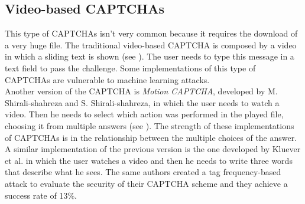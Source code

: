 \subsection{Video-based CAPTCHAs}
This type of CAPTCHAs isn't very common because it requires the download of a very huge file\cite{survey_advanced_CAPTCHA}. The traditional video-based CAPTCHA is composed by a video in which a sliding text is shown (see ). The user needs to type this message in a text field to pass the challenge. Some implementations of this type of CAPTCHAs are vulnerable to machine learning attacks.\\
Another version of the CAPTCHA is \textit{Motion CAPTCHA}\cite{Motion_CAPTCHA}, developed by M. Shirali-shahreza and S. Shirali-shahreza, in which the user needs to watch a video. Then he needs to select which action was performed in the played file, choosing it from multiple answers (see ). The strength of these implementations of CAPTCHAs is in the relationship between the multiple choices of the answer\cite{video_attack}.\\
A similar implementation of the previous version is the one developed by Kluever et al. in which the user watches a video and then he needs to write three words that describe what he sees\cite{video_desc}. The same authors created a tag frequency-based attack to evaluate the security of their CAPTCHA scheme and they achieve a success rate of 13\%.
